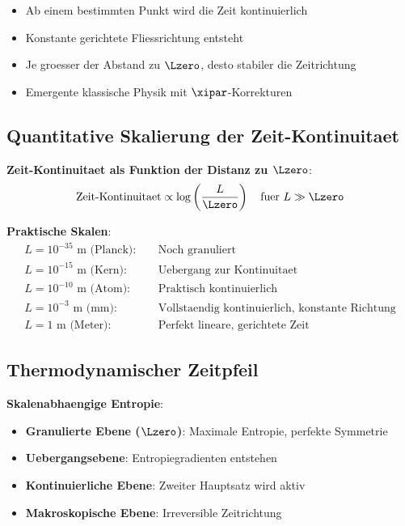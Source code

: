 	\begin{itemize}
		\item Ab einem bestimmten Punkt wird die Zeit kontinuierlich
		\item Konstante gerichtete Fliessrichtung entsteht
		\item Je groesser der Abstand zu $\Lzero$, desto stabiler die Zeitrichtung
		\item Emergente klassische Physik mit $\xipar$-Korrekturen
	\end{itemize}
	
	\subsection{Quantitative Skalierung der Zeit-Kontinuitaet}
	
	\textbf{Zeit-Kontinuitaet als Funktion der Distanz zu $\Lzero$}:
	\begin{equation}
		\text{Zeit-Kontinuitaet} \propto \log\left(\frac{L}{\Lzero}\right) \quad \text{fuer } L \gg \Lzero
	\end{equation}
	
	\textbf{Praktische Skalen}:
	\begin{align}
		L = 10^{-35}\text{ m (Planck)}: &\quad \text{Noch granuliert} \\
		L = 10^{-15}\text{ m (Kern)}: &\quad \text{Uebergang zur Kontinuitaet} \\
		L = 10^{-10}\text{ m (Atom)}: &\quad \text{Praktisch kontinuierlich} \\
		L = 10^{-3}\text{ m (mm)}: &\quad \text{Vollstaendig kontinuierlich, konstante Richtung} \\
		L = 1\text{ m (Meter)}: &\quad \text{Perfekt lineare, gerichtete Zeit}
	\end{align}
	
	\subsection{Thermodynamischer Zeitpfeil}
	
	\textbf{Skalenabhaengige Entropie}:
	\begin{itemize}
		\item \textbf{Granulierte Ebene ($\Lzero$)}: Maximale Entropie, perfekte Symmetrie
		\item \textbf{Uebergangsebene}: Entropiegradienten entstehen
		\item \textbf{Kontinuierliche Ebene}: Zweiter Hauptsatz wird aktiv
		\item \textbf{Makroskopische Ebene}: Irreversible Zeitrichtung
	\end{itemize}
	
